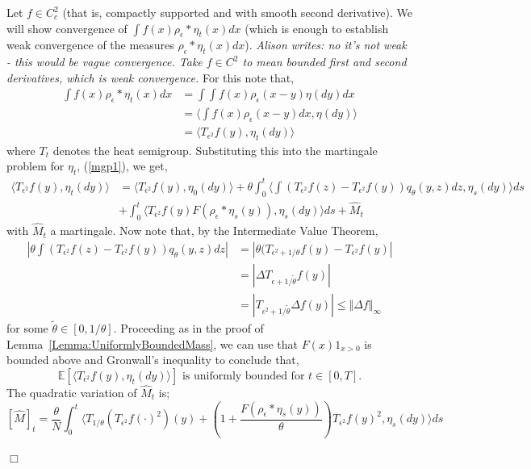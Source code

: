 \documentclass[12pt]{article}
\newenvironment {proof}{{\noindent\bf Proof }}{\hfill $\Box$ \medskip}
\def \tilde{\widetilde}
\newcommand{\IE}{\mathbb E}
\newcommand{\comment}[1]{{\color{blue} \it #1}}
\begin{document}
\begin{proof}

Let $f \in C_c^2$ (that is, compactly supported and with smooth second derivative). We will show convergence of $\int f(x) \rho_\epsilon * \eta_t(x) dx$ (which is enough to establish weak convergence of the measures $\rho_\epsilon * \eta_t(x) dx$).
\comment{Alison writes: no it's not weak - this would be vague convergence. Take $f \in C^2$ to mean bounded first and second derivatives, which is weak convergence.}
For this note that,
\begin{align*}
\int f(x) \rho_\epsilon * \eta_t(x) dx &= \int \int f(x) \rho_\epsilon (x-y) \eta(dy) dx \\ & = \langle \int f(x) \rho_\epsilon(x-y) dx, \eta(dy) \rangle \\ &= \langle T_{\epsilon^2} f(y), \eta_t(dy) \rangle
\end{align*}
where $T_t$ denotes the heat semigroup. Substituting this into the martingale problem for $\eta_t$, (\ref{mgp1}), we get,
\begin{align}
\langle T_{\epsilon^2} f(y), \eta_t(dy) \rangle & = \langle T_{\epsilon^2}
 f(y), \eta_0(dy) \rangle + \theta \int_0^t \langle \int (T_{\epsilon^2} f(z) - T_{\epsilon^2} f(y))q_\theta(y,z)dz, \eta_s(dy)\rangle ds \nonumber \\ &+\int_0^t \langle T_{\epsilon^2} f(y) F(\rho_\epsilon*\eta_s(y)), \eta_s(dy) \rangle ds + \widehat{M}_t \label{MGPT_epsilon} \end{align}
 with $\widehat{M}_t$ a martingale. Now note that,
by the Intermediate Value Theorem,
 \begin{align}
    | \theta \int (T_{\epsilon^2} f(z) - T_{\epsilon^2}f(y))q_\theta(y,z) dz | &= |\theta( T_{\epsilon^2 + 1/\theta} f(y) - T_{\epsilon^2}f(y)| \nonumber \\ &= | \Delta T_{\epsilon+1/\tilde{\theta}} f(y) | \nonumber \\ &=|T_{\epsilon^2 + 1/\tilde{\theta}} \Delta f(y) | \leq \Vert \Delta f \Vert_{\infty} \label{ShortBoundLaplacianHS}
 \end{align}
for some $\tilde{\theta} \in [0,1/\theta]$.
Proceeding as in the proof of Lemma~\ref{Lemma:UniformlyBoundedMass}, we can use that $F(x)1_{x > 0}$ is bounded above and Gronwall's inequality to conclude that,
\[ \IE\left[\langle T_{\epsilon^2} f(y), \eta_t(dy) \rangle \right] \text{ is uniformly bounded for } t \in [0,T].\]
The quadratic variation of $\widehat{M}_t$ is;
\[ [ \widehat{M}]_t = \frac{\theta}{N}\int_0^t \langle T_{1/\theta}(T_{\epsilon^2}f(\cdot)^2)(y) + \left(1+\frac{F(\rho_\epsilon*\eta_s(y))}{\theta}\right)T_{\epsilon^2}f(y)^2, \eta_s(dy) \rangle ds \]

\end{proof}
\end{document}
